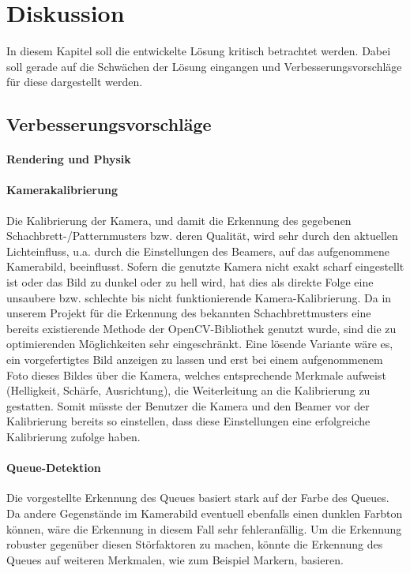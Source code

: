 \chapter{Diskussion}
In diesem Kapitel soll die entwickelte Lösung kritisch betrachtet werden. Dabei soll gerade auf die Schwächen der Lösung eingangen und Verbesserungsvorschläge für diese dargestellt werden.



\section{Verbesserungsvorschläge}

\subsubsection{Rendering und Physik}

\subsubsection{Kamerakalibrierung}
Die Kalibrierung der Kamera, und damit die Erkennung des gegebenen Schachbrett-/Patternmusters bzw. deren Qualität, wird sehr durch den aktuellen Lichteinfluss, u.a. durch die Einstellungen des Beamers, auf das aufgenommene Kamerabild, beeinflusst.
Sofern die genutzte Kamera nicht exakt scharf eingestellt ist oder das Bild zu dunkel oder zu hell wird, hat dies als direkte Folge eine unsaubere bzw. schlechte bis nicht funktionierende Kamera-Kalibrierung. 
Da in unserem Projekt für die Erkennung des bekannten Schachbrettmusters eine bereits existierende Methode der OpenCV-Bibliothek genutzt wurde, sind die zu optimierenden Möglichkeiten sehr eingeschränkt.
Eine lösende Variante wäre es, ein vorgefertigtes Bild anzeigen zu lassen und erst bei einem aufgenommenem Foto dieses Bildes über die Kamera, welches entsprechende Merkmale aufweist (Helligkeit, Schärfe, Ausrichtung), die Weiterleitung an die Kalibrierung zu gestatten. Somit müsste der Benutzer die Kamera und den Beamer vor der Kalibrierung bereits so einstellen, dass diese Einstellungen eine erfolgreiche Kalibrierung zufolge haben.


\subsubsection{Queue-Detektion}
Die vorgestellte Erkennung des Queues basiert stark auf der Farbe des Queues. 
Da andere Gegenstände im Kamerabild eventuell ebenfalls einen dunklen Farbton können, wäre die Erkennung in diesem Fall sehr fehleranfällig. 
Um die Erkennung robuster gegenüber diesen Störfaktoren zu machen, könnte die Erkennung des Queues auf weiteren Merkmalen, wie zum Beispiel Markern, basieren.

